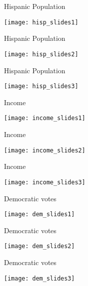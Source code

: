 \documentclass[xcolor=pdftex,dvipsnames,table,handout]{beamer}
\begin{document}
\begin{frame}{Hispanic Population}
\begin{center}
\texttt{[image: hisp\_slides1]}
\end{center}
\end{frame}

\begin{frame}{Hispanic Population}
\begin{center}
\texttt{[image: hisp\_slides2]}
\end{center}
\end{frame}

\begin{frame}{Hispanic Population}
\begin{center}
\texttt{[image: hisp\_slides3]}
\end{center}
\end{frame}

\begin{frame}{Income}
\begin{center}
\texttt{[image: income\_slides1]}
\end{center}
\end{frame}

\begin{frame}{Income}
\begin{center}
\texttt{[image: income\_slides2]}
\end{center}
\end{frame}

\begin{frame}{Income}
\begin{center}
\texttt{[image: income\_slides3]}
\end{center}
\end{frame}

\begin{frame}{Democratic votes}
\begin{center}
\texttt{[image: dem\_slides1]}
\end{center}
\end{frame}

\begin{frame}{Democratic votes}
\begin{center}
\texttt{[image: dem\_slides2]}
\end{center}
\end{frame}

\begin{frame}{Democratic votes}
\begin{center}
\texttt{[image: dem\_slides3]}
\end{center}
\end{frame}
\end{document}

